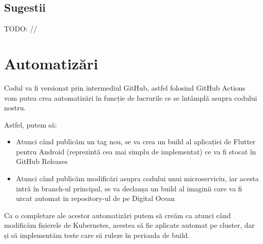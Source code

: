 \subsection{Sugestii}

TODO: //

\section{Automatizări}

Codul va fi versionat prin intermediul GitHub, astfel folosind GitHub Actions vom putea crea
automatizări în funcție de lucrurile ce se întâmplă asupra codului nostru.

Astfel, putem să:

\begin{itemize}
    \item Atunci când publicăm un tag nou, se va crea un build al aplicației de Flutter pentru Android
          (reprezintă cea mai simplu de implementat) ce va fi stocat în GitHub Releases
    \item Atunci când publicăm modificări asupra codului unui microserviciu, iar acesta intră în branch-ul principal,
          se va declanșa un build al imaginii care va fi urcat automat in repository-ul de pe Digital Ocean
\end{itemize}

Ca o completare ale acestor automatizări putem să creăm ca atunci când modificăm
fișierele de Kubernetes, acestea să fie aplicate automat pe cluster, dar și
să implementăm teste care să ruleze în perioada de build.

